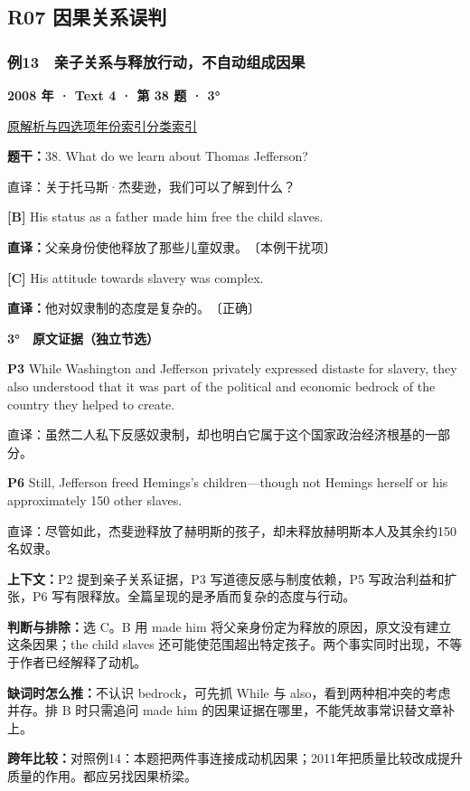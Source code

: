\documentclass[11pt,a4paper]{article}
\begin{document}
\subsection{R07 因果关系误判}
\subsubsection{例13　亲子关系与释放行动，不自动组成因果}\label{case-2008-T4-Q38}
\noindent\textbf{2008 年 · Text 4 · 第 38 题 · 3°}\par\noindent \href{https://zj139.github.io/math-notes/english/a16ec662060c5d5cc8e15f6b/\#q38}{原解析与四选项}\quad \hyperref[idx-2008-T4-Q38]{年份索引}\quad \hyperref[class-R07]{分类索引}\par\smallskip
\noindent\textbf{题干：}38. What do we learn about Thomas Jefferson?\par
直译：关于托马斯·杰斐逊，我们可以了解到什么？\par
{}\noindent\textbf{[B]} His status as a father made him free the child slaves.\par\nopagebreak
\noindent\textbf{直译：}父亲身份使他释放了那些儿童奴隶。　〔本例干扰项〕\par
{}\noindent\textbf{[C]} His attitude towards slavery was complex.\par\nopagebreak
\noindent\textbf{直译：}他对奴隶制的态度是复杂的。　〔正确〕\par
\begin{evidence}\textbf{3°　原文证据（独立节选）}\par
\textbf{P3} While Washington and Jefferson privately expressed distaste for slavery, they also understood that it was part of the political and economic bedrock of the country they helped to create.\par 直译：虽然二人私下反感奴隶制，却也明白它属于这个国家政治经济根基的一部分。\par
\textbf{P6} Still, Jefferson freed Hemings's children—though not Hemings herself or his approximately 150 other slaves.\par 直译：尽管如此，杰斐逊释放了赫明斯的孩子，却未释放赫明斯本人及其余约150名奴隶。\par
\end{evidence}
\noindent\textbf{上下文：}P2 提到亲子关系证据，P3 写道德反感与制度依赖，P5 写政治利益和扩张，P6 写有限释放。全篇呈现的是矛盾而复杂的态度与行动。\par
\noindent\textbf{判断与排除：}选 C。B 用 made him 将父亲身份定为释放的原因，原文没有建立这条因果；the child slaves 还可能使范围超出特定孩子。两个事实同时出现，不等于作者已经解释了动机。\par
\noindent\textbf{缺词时怎么推：}不认识 bedrock，可先抓 While 与 also，看到两种相冲突的考虑并存。排 B 时只需追问 made him 的因果证据在哪里，不能凭故事常识替文章补上。\par
\noindent\textbf{跨年比较：}对照例14：本题把两件事连接成动机因果；2011年把质量比较改成提升质量的作用。都应另找因果桥梁。\par
\clearpage
\end{document}
